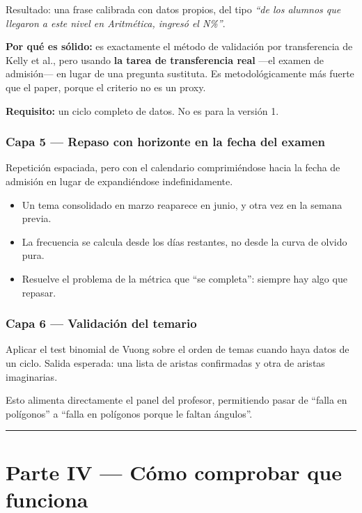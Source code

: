 \documentclass[11pt,a4paper]{article}
\begin{document}
Resultado: una frase calibrada con datos propios, del tipo \emph{``de los alumnos que llegaron a este nivel en Aritmética, ingresó el N\%''}.

\textbf{Por qué es sólido:} es exactamente el método de validación por transferencia de Kelly et al., pero usando \textbf{la tarea de transferencia real} ---el examen de admisión--- en lugar de una pregunta sustituta. Es metodológicamente más fuerte que el paper, porque el criterio no es un proxy.

\textbf{Requisito:} un ciclo completo de datos. No es para la versión 1.

\section{Capa 5 --- Repaso con horizonte en la fecha del examen}

Repetición espaciada, pero con el calendario comprimiéndose hacia la fecha de admisión en lugar de expandiéndose indefinidamente.

\begin{itemize}
\item Un tema consolidado en marzo reaparece en junio, y otra vez en la semana previa.
\item La frecuencia se calcula desde los días restantes, no desde la curva de olvido pura.
\item Resuelve el problema de la métrica que ``se completa'': siempre hay algo que repasar.
\end{itemize}

\section{Capa 6 --- Validación del temario}

Aplicar el test binomial de Vuong sobre el orden de temas cuando haya datos de un ciclo. Salida esperada: una lista de aristas confirmadas y otra de aristas imaginarias.

Esto alimenta directamente el panel del profesor, permitiendo pasar de ``falla en polígonos'' a ``falla en polígonos porque le faltan ángulos''.

\vspace{12pt}
\hrule
\vspace{14pt}

\part*{Parte IV --- Cómo comprobar que funciona}
\end{document}
